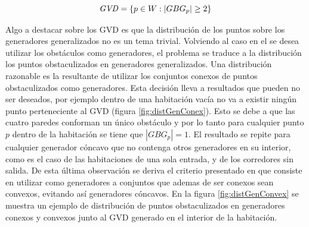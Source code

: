 

\begin{equation}
  \mathit{GVD}  = \{p \in W : |GBG_p| \geq 2\}\label{eq:GVD}
\end{equation}

Algo a destacar sobre los GVD es que la distribución de los puntos sobre los
generadores generalizados no es un tema trivial. Volviendo al caso en el se
desea utilizar los obstáculos como generadores, el problema se traduce a la
distribución los puntos obstaculizados en generadores generalizados. Una
distribución razonable es la resultante de utilizar los conjuntos conexos de
puntos obstaculizados como generadores. Esta decisión lleva a resultados que
pueden no ser deseados, por ejemplo dentro de una habitación vacía no va a
existir ningún punto perteneciente al GVD (figura \ref{fig:distGenConex}). Esto
se debe a que las cuatro paredes conforman un único obstáculo y por lo tanto
para cualquier punto $p$ dentro de la habitación se tiene que $|GBG_p| = 1$.
El resultado se repite para cualquier generador cóncavo que no contenga otros
generadores en su interior, como es el caso de las habitaciones de una sola
entrada, y de los corredores sin salida. De esta última observación se deriva
el criterio presentado en \cite{choset2005principles} que consiste en utilizar
como generadores a conjuntos que ademas de ser conexos sean convexos, evitando
así generadores cóncavos. En la figura \ref{fig:distGenConvex} se muestra un
ejemplo de distribución de puntos obstaculizados en generadores conexos y
convexos junto al GVD generado en el interior de la habitación. 

